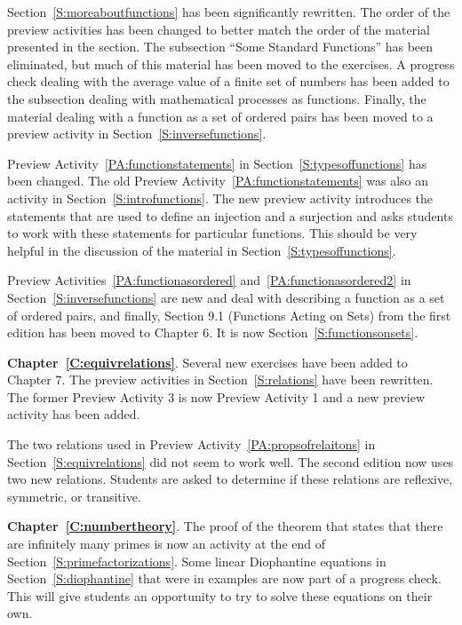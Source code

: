 Section~\ref{S:moreaboutfunctions} has been significantly rewritten.  The order of the preview activities has been changed to better match the order of the material presented in the section.  The subsection ``Some Standard Functions'' has been eliminated, but much of this material has been moved to the exercises.  A progress check dealing with the average value of a finite set of numbers has been added to the subsection dealing with mathematical processes as functions.  Finally, the material dealing with a function as a set of ordered pairs has been moved to a preview activity in 
Section~\ref{S:inversefunctions}.  

Preview Activity~\ref{PA:functionstatements} in Section~\ref{S:typesoffunctions} has been changed.  The old Preview Activity~\ref{PA:functionstatements} was also an activity in Section~\ref{S:introfunctions}.  The new preview activity introduces the statements that are used to define an injection and a surjection and asks students to work with these statements for particular functions.  This should be very helpful in the discussion of the material in Section~\ref{S:typesoffunctions}.

Preview Activities~\ref{PA:functionasordered} and~\ref{PA:functionasordered2} in 
Section~\ref{S:inversefunctions} are new and deal with describing a function as a set of ordered pairs, and finally, Section 9.1 (Functions Acting on Sets) from the first edition has been moved to Chapter 6.  It is now Section~\ref{S:functionsonsets}.
 

\vskip6pt
\noindent
\textbf{Chapter~\ref{C:equivrelations}}.  Several new exercises have been added to Chapter 7.  The preview activities in Section~\ref{S:relations} have been rewritten.  The former Preview Activity 3 is now Preview Activity 1 and a new preview activity has been added.

The two relations used in Preview Activity~\ref{PA:propsofrelaitons} in 
Section~\ref{S:equivrelations} did not seem to work well.  The second edition now uses two new relations.  Students are asked to determine if these relations are reflexive, symmetric, or transitive.


\vskip6pt
\noindent
\textbf{Chapter~\ref{C:numbertheory}}.  The proof of the theorem that states that there are infinitely many primes is now an activity at the end of 
Section~\ref{S:primefactorizations}.  Some  linear Diophantine equations in 
Section~\ref{S:diophantine}  that were in examples are now part of a progress check.  This will give students an opportunity to try to solve these equations on their own.



